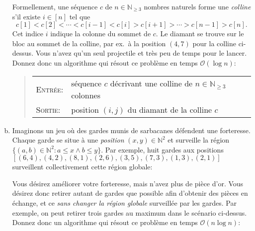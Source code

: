 \documentclass{article}
\newcommand{\N}{\mathbb{N}}                      %
\renewcommand{\O}{\mathcal{O}}                   %
\begin{document}
\begin{question}
\begin{enumerate}[(a)]
\begin{center}
    \end{center}\bigskip\smallskip
    
    Formellement, une séquence $c$ de $n \in \N_{\geq 3}$ nombres
    naturels forme une \emph{colline} s'il existe $i \in [n]$ tel que
    $$c[1] < c[2] < \cdots < c[i - 1] < c[i] > c[i + 1] > \cdots >
    c[n-1] > c[n].$$ Cet indice $i$ indique la colonne du sommet de
    $c$. Le diamant se trouve sur le bloc au sommet de la colline, par
    ex.\ à la position $(4, 7)$ pour la colline ci-dessus. Vous n'avez
    qu'un seul projectile et très peu de temps pour le lancer. Donnez
    donc un algorithme qui résout ce problème en temps $\O(\log n)$:
  
    \begin{quote}
      \vspace*{6pt}
      \begin{tabular}{lp{10cm}}
        \textsc{Entrée}: & séquence $c$ décrivant une colline de $n \in
        \N_{\geq 3}$ colonnes \\[2pt]
        
        \textsc{Sortie}: & position $(i, j)$ du diamant de la colline $c$
      \end{tabular}
      \vspace*{5pt}
    \end{quote}

  \item Imaginons  un jeu où des gardes
    munis de sarbacanes défendent une forteresse. Chaque garde se
    situe à une \emph{po\-si\-tion} $(x, y) \in \N^2$ et surveille la
    région $\{(a, b) \in \N^2 : a \leq x \land b \leq y\}$. Par
    exemple, huit gardes aux positions $[(6, 4), (4, 2), (8, 1), (2,
      6), (3, 5), (7, 3), (1, 3), (2, 1)]$ surveillent collectivement
    cette région globale:

    \begin{center}
      
    \end{center}\medskip

    Vous désirez améliorer votre forteresse, mais n'avez plus de pièce
    d'or. Vous désirez donc retirer autant de gardes que possible afin
    d'obtenir des pièces en échange, et ce \emph{sans changer la
      ré\-gion globale} surveillée par les gardes. Par exemple, on
    peut retirer trois gardes au maximum dans le scénario
    ci-dessus. Donnez donc un algorithme qui résout ce problème en
    temps $\O(n \log n)$:


\end{enumerate}
\end{question}
\end{document}
